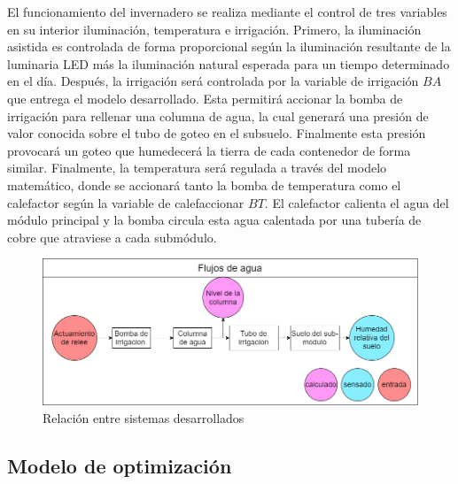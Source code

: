 \documentclass[letterpaper,conference]{IEEEtran}
\begin{document}
			



		El funcionamiento del invernadero se realiza mediante el control de tres variables en su interior iluminación, temperatura e irrigación. Primero, la iluminación asistida es controlada de forma proporcional según la iluminación resultante de la luminaria LED más la iluminación natural esperada para un tiempo determinado en el día. Después, la irrigación será controlada por la variable de irrigación $BA$ que entrega el modelo desarrollado. Esta permitirá accionar la bomba de irrigación para rellenar una columna de agua, la cual generará una presión de valor conocida sobre el tubo de goteo en el subsuelo. Finalmente esta presión provocará un goteo que humedecerá la tierra de cada contenedor de forma similar. Finalmente, la temperatura será regulada a través del modelo matemático, donde se accionará tanto la bomba de temperatura como el calefactor según la variable de calefaccionar $BT$. El calefactor calienta el agua del módulo principal y la bomba circula esta agua calentada por una tubería de cobre que atraviese a cada submódulo.
				
		
		
	\begin{figure}[h!]
		\centering
		\includegraphics[width=.85\linewidth]{imagenes/flujos de agua.png} 
		\caption{Relación entre sistemas desarrollados}
		\label{fig:flujo_agua}
	\end{figure}						
			
			


\subsection{Modelo de optimización}
	
\end{document}
